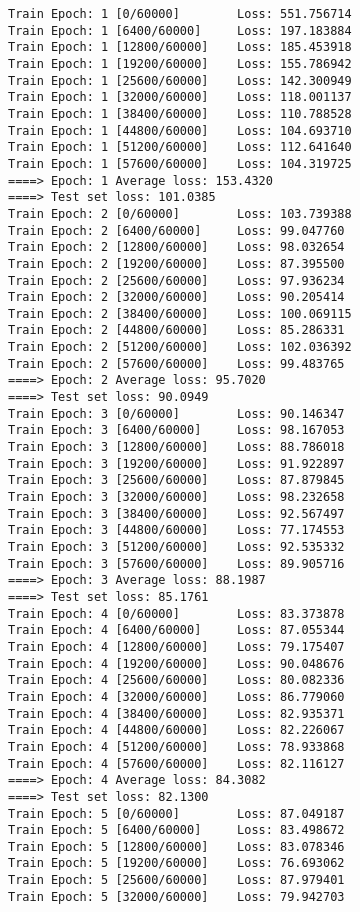 \documentclass[11pt]{article}
\begin{document}
    \begin{Verbatim}[commandchars=\\\{\}]
Train Epoch: 1 [0/60000]        Loss: 551.756714
Train Epoch: 1 [6400/60000]     Loss: 197.183884
Train Epoch: 1 [12800/60000]    Loss: 185.453918
Train Epoch: 1 [19200/60000]    Loss: 155.786942
Train Epoch: 1 [25600/60000]    Loss: 142.300949
Train Epoch: 1 [32000/60000]    Loss: 118.001137
Train Epoch: 1 [38400/60000]    Loss: 110.788528
Train Epoch: 1 [44800/60000]    Loss: 104.693710
Train Epoch: 1 [51200/60000]    Loss: 112.641640
Train Epoch: 1 [57600/60000]    Loss: 104.319725
====> Epoch: 1 Average loss: 153.4320
====> Test set loss: 101.0385
Train Epoch: 2 [0/60000]        Loss: 103.739388
Train Epoch: 2 [6400/60000]     Loss: 99.047760
Train Epoch: 2 [12800/60000]    Loss: 98.032654
Train Epoch: 2 [19200/60000]    Loss: 87.395500
Train Epoch: 2 [25600/60000]    Loss: 97.936234
Train Epoch: 2 [32000/60000]    Loss: 90.205414
Train Epoch: 2 [38400/60000]    Loss: 100.069115
Train Epoch: 2 [44800/60000]    Loss: 85.286331
Train Epoch: 2 [51200/60000]    Loss: 102.036392
Train Epoch: 2 [57600/60000]    Loss: 99.483765
====> Epoch: 2 Average loss: 95.7020
====> Test set loss: 90.0949
Train Epoch: 3 [0/60000]        Loss: 90.146347
Train Epoch: 3 [6400/60000]     Loss: 98.167053
Train Epoch: 3 [12800/60000]    Loss: 88.786018
Train Epoch: 3 [19200/60000]    Loss: 91.922897
Train Epoch: 3 [25600/60000]    Loss: 87.879845
Train Epoch: 3 [32000/60000]    Loss: 98.232658
Train Epoch: 3 [38400/60000]    Loss: 92.567497
Train Epoch: 3 [44800/60000]    Loss: 77.174553
Train Epoch: 3 [51200/60000]    Loss: 92.535332
Train Epoch: 3 [57600/60000]    Loss: 89.905716
====> Epoch: 3 Average loss: 88.1987
====> Test set loss: 85.1761
Train Epoch: 4 [0/60000]        Loss: 83.373878
Train Epoch: 4 [6400/60000]     Loss: 87.055344
Train Epoch: 4 [12800/60000]    Loss: 79.175407
Train Epoch: 4 [19200/60000]    Loss: 90.048676
Train Epoch: 4 [25600/60000]    Loss: 80.082336
Train Epoch: 4 [32000/60000]    Loss: 86.779060
Train Epoch: 4 [38400/60000]    Loss: 82.935371
Train Epoch: 4 [44800/60000]    Loss: 82.226067
Train Epoch: 4 [51200/60000]    Loss: 78.933868
Train Epoch: 4 [57600/60000]    Loss: 82.116127
====> Epoch: 4 Average loss: 84.3082
====> Test set loss: 82.1300
Train Epoch: 5 [0/60000]        Loss: 87.049187
Train Epoch: 5 [6400/60000]     Loss: 83.498672
Train Epoch: 5 [12800/60000]    Loss: 83.078346
Train Epoch: 5 [19200/60000]    Loss: 76.693062
Train Epoch: 5 [25600/60000]    Loss: 87.979401
Train Epoch: 5 [32000/60000]    Loss: 79.942703

\end{Verbatim}
\end{document}
